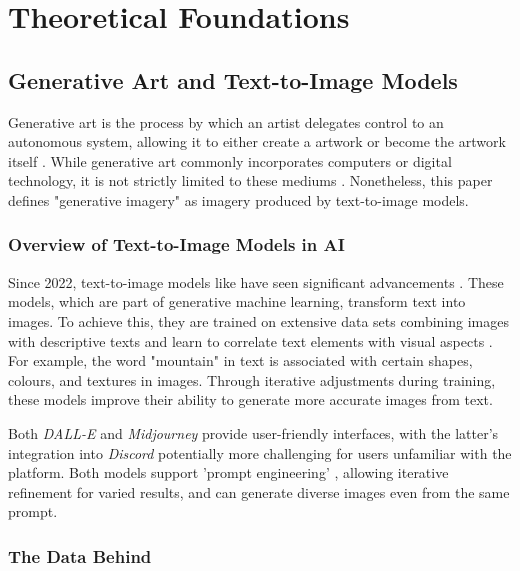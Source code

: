 \section{Theoretical Foundations}
\label{section:theoretical-foundations}

\subsection{Generative Art and Text-to-Image Models}
\label{subsec:generative-art}

Generative art is the process by which an artist delegates control to an autonomous system, allowing it to either create a artwork or become the artwork itself \parencite[112]{Galanter2019}. While generative art commonly incorporates computers or digital technology, it is not strictly limited to these mediums \parencite[5]{Thomas2023}. Nonetheless, this paper defines "generative imagery" as imagery produced by text-to-image models. 

\subsubsection{Overview of Text-to-Image Models in AI}

Since 2022, text-to-image models like have seen significant advancements \parencite{Gozalo2023}. These models, which are part of generative machine learning, transform text into images. To achieve this, they are trained on extensive data sets combining images with descriptive texts and learn to correlate text elements with visual aspects \parencite{Bie2023}. For example, the word "mountain" in text is associated with certain shapes, colours, and textures in images. Through iterative adjustments during training, these models improve their ability to generate more accurate images from text.

Both \textit{DALL-E} and \textit{Midjourney} \parencite[5]{Thomas2023} provide user-friendly interfaces, with the latter's integration into \textit{Discord} potentially more challenging for users unfamiliar with the platform. Both models support 'prompt engineering' \parencite{Liu2022}, allowing iterative refinement for varied results, and can generate diverse images even from the same prompt.

\subsubsection{The Data Behind}
\label{sec:data-behind}

